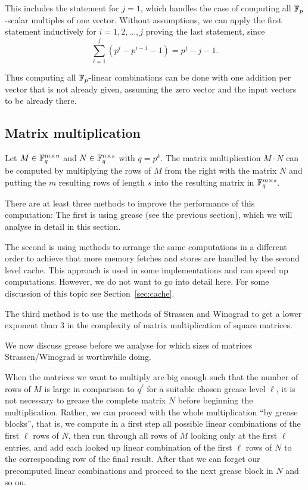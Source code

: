 This includes the statement for $j=1$, which handles the case of computing
all $\mathbb{F}_p$-scalar multiples of one vector. Without assumptions, we can
apply the first statement inductively for $i=1, 2, \ldots, j$ proving
the last statement, since
\[ \sum_{i=1}^j (p^i - p^{i-1} - 1) = p^j - j - 1. \]
\ProofEnd

\begin{Rem}
Thus computing all $\mathbb{F}_p$-linear combinations can be done
with one addition per vector that is not already given, assuming
the zero vector and the input vectors to be already there.
\end{Rem}

\subsection{Matrix multiplication}

Let $M \in \mathbb{F}_q^{m \times n}$ and $N \in \mathbb{F}_q^{n \times s}$ with $q = p^k$.
The matrix multiplication $M \cdot N$ can be computed by multiplying the
rows of $M$ from the right with the matrix $N$ and putting the $m$ resulting
rows of length $s$ into the resulting matrix in $\mathbb{F}_q^{m \times s}$.

There are at least three methods to improve the performance of this
computation: The first is using grease (see the previous section), which
we will analyse in detail in this section. 

The second is using
methods to arrange the same computations in a different order to 
achieve that more memory fetches and stores are handled by the second
level cache. This approach is used in some implementations and can
speed up computations. However, we do not want to go into detail here.
For some discussion of this topic see Section~\ref{sec:cache}. 

The third method is to use the methods of Strassen and Winograd to
get a lower exponent than $3$ in the complexity of matrix multiplication
of square matrices.

We now discuss grease before we analyse for which sizes of
matrices Strassen/Winograd is worthwhile doing.

When the matrices we want to multiply are big enough such that the number
of rows of $M$ is large in comparison to $q^\ell$
for a suitable chosen grease level $\ell$, it is not necessary to grease
the complete matrix $N$ before beginning the multiplication. Rather,
we can proceed with the whole multiplication ``by grease blocks'', that
is, we compute in a first step all possible linear combinations of the
first $\ell$ rows of $N$, then run through all rows of $M$ looking
only at the first $\ell$ entries, and add each looked up
linear combination of the first $\ell$ rows of $N$ to the corresponding
row of the final result. After that we can forget our precomputed linear
combinations and proceed to the next grease block in $N$ and so on.


